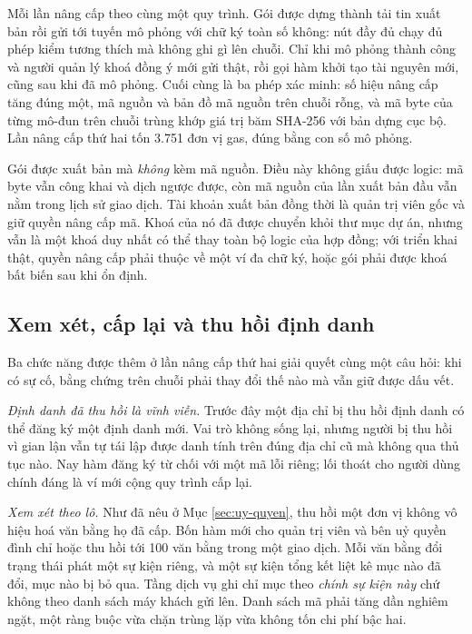Mỗi lần nâng cấp theo cùng một quy trình. Gói được dựng thành tải tin xuất bản rồi gửi tới tuyến mô phỏng với chữ ký toàn số không: nút đầy đủ chạy đủ phép kiểm tương thích mà không ghi gì lên chuỗi. Chỉ khi mô phỏng thành công và người quản lý khoá đồng ý mới gửi thật, rồi gọi hàm khởi tạo tài nguyên mới, cũng sau khi đã mô phỏng. Cuối cùng là ba phép xác minh: số hiệu nâng cấp tăng đúng một, mã nguồn và bản đồ mã nguồn trên chuỗi rỗng, và mã byte của từng mô-đun trên chuỗi trùng khớp giá trị băm SHA-256 với bản dựng cục bộ. Lần nâng cấp thứ hai tốn 3.751 đơn vị gas, đúng bằng con số mô phỏng.

Gói được xuất bản mà \emph{không} kèm mã nguồn. Điều này không giấu được logic: mã byte vẫn công khai và dịch ngược được, còn mã nguồn của lần xuất bản đầu vẫn nằm trong lịch sử giao dịch. Tài khoản xuất bản đồng thời là quản trị viên gốc và giữ quyền nâng cấp mã. Khoá của nó đã được chuyển khỏi thư mục dự án, nhưng vẫn là một khoá duy nhất có thể thay toàn bộ logic của hợp đồng; với triển khai thật, quyền nâng cấp phải thuộc về một ví đa chữ ký, hoặc gói phải được khoá bất biến sau khi ổn định.

\subsection{Xem xét, cấp lại và thu hồi định danh}
\label{sec:xem-xet}

Ba chức năng được thêm ở lần nâng cấp thứ hai giải quyết cùng một câu hỏi: khi có sự cố, bằng chứng trên chuỗi phải thay đổi thế nào mà vẫn giữ được dấu vết.

\textit{Định danh đã thu hồi là vĩnh viễn.} Trước đây một địa chỉ bị thu hồi định danh có thể đăng ký một định danh mới. Vai trò không sống lại, nhưng người bị thu hồi vì gian lận vẫn tự tái lập được danh tính trên đúng địa chỉ cũ mà không qua thủ tục nào. Nay hàm đăng ký từ chối với một mã lỗi riêng; lối thoát cho người dùng chính đáng là ví mới cộng quy trình cấp lại.

\textit{Xem xét theo lô.} Như đã nêu ở Mục \ref{sec:uy-quyen}, thu hồi một đơn vị không vô hiệu hoá văn bằng họ đã cấp. Bốn hàm mới cho quản trị viên và bên uỷ quyền đình chỉ hoặc thu hồi tới 100 văn bằng trong một giao dịch. Mỗi văn bằng đổi trạng thái phát một sự kiện riêng, và một sự kiện tổng kết liệt kê mục nào đã đổi, mục nào bị bỏ qua. Tầng dịch vụ ghi chỉ mục theo \emph{chính sự kiện này} chứ không theo danh sách máy khách gửi lên. Danh sách mã phải tăng dần nghiêm ngặt, một ràng buộc vừa chặn trùng lặp vừa không tốn chi phí bậc hai.

